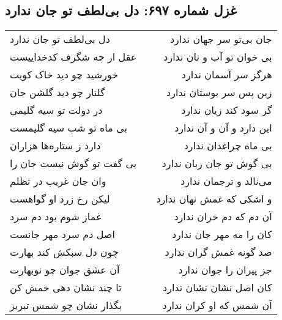 \begin{center}
\section*{غزل شماره ۶۹۷: دل بی‌لطف تو جان ندارد}
\label{sec:0697}
\begin{longtable}{l p{0.5cm} r}
دل بی‌لطف تو جان ندارد
&&
جان بی‌تو سر جهان ندارد
\\
عقل ار چه شگرف کدخداییست
&&
بی خوان تو آب و نان ندارد
\\
خورشید چو دید خاک کویت
&&
هرگز سر آسمان ندارد
\\
گلنار چو دید گلشن جان
&&
زین پس سر بوستان ندارد
\\
در دولت تو سیه گلیمی
&&
گر سود کند زیان ندارد
\\
بی ماه تو شب سیه گلیمست
&&
این دارد و آن و آن ندارد
\\
دارد ز ستاره‌ها هزاران
&&
بی ماه چراغدان ندارد
\\
بی گفت تو گوش نیست جان را
&&
بی گوش تو جان زبان ندارد
\\
وان جان غریب در تظلم
&&
می‌نالد و ترجمان ندارد
\\
لیکن رخ زرد او گواهست
&&
و اشکی که غمش نهان ندارد
\\
غماز شوم بود دم سرد
&&
آن دم که دم خران ندارد
\\
اصل دم سرد مهر جانست
&&
کان را مه مهر جان ندارد
\\
چون دل سبکش کند بهارت
&&
صد گونه غمش گران ندارد
\\
آن عشق جوان چو نوبهارت
&&
جز پیران را جوان ندارد
\\
تا چند نشان دهی خمش کن
&&
کان اصل نشان نشان ندارد
\\
بگذار نشان چو شمس تبریز
&&
آن شمس که او کران ندارد
\\
\end{longtable}
\end{center}
